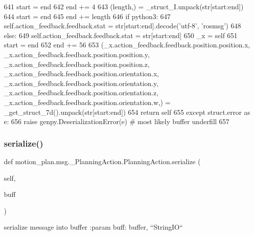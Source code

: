 \begin{DoxyCode}
641       start = end
642       end += 4
643       (length,) = \_struct\_I.unpack(str[start:end])
644       start = end
645       end += length
646       \textcolor{keywordflow}{if} python3:
647         self.action\_feedback.feedback.stat = str[start:end].decode(\textcolor{stringliteral}{'utf-8'}, \textcolor{stringliteral}{'rosmsg'})
648       \textcolor{keywordflow}{else}:
649         self.action\_feedback.feedback.stat = str[start:end]
650       \_x = self
651       start = end
652       end += 56
653       (\_x.action\_feedback.feedback.position.position.x, \_x.action\_feedback.feedback.position.position.y, 
      \_x.action\_feedback.feedback.position.position.z, \_x.action\_feedback.feedback.position.orientation.x, 
      \_x.action\_feedback.feedback.position.orientation.y, \_x.action\_feedback.feedback.position.orientation.z, 
      \_x.action\_feedback.feedback.position.orientation.w,) = \_get\_struct\_7d().unpack(str[start:end])
654       \textcolor{keywordflow}{return} self
655     \textcolor{keywordflow}{except} struct.error \textcolor{keyword}{as} e:
656       \textcolor{keywordflow}{raise} genpy.DeserializationError(e)  \textcolor{comment}{# most likely buffer underfill}
657 
\end{DoxyCode}
\mbox{\label{classmotion__plan_1_1msg_1_1__PlanningAction_1_1PlanningAction_a9d3850a45685dff0e6fa0bc7ee37c343}} 
\subsubsection{\texorpdfstring{serialize()}{serialize()}}
{\footnotesize\ttfamily def motion\+\_\+plan.\+msg.\+\_\+\+Planning\+Action.\+Planning\+Action.\+serialize (\begin{DoxyParamCaption}\item[{}]{self,  }\item[{}]{buff }\end{DoxyParamCaption})}

\begin{DoxyVerb}serialize message into buffer
:param buff: buffer, ``StringIO``
\end{DoxyVerb}
 

